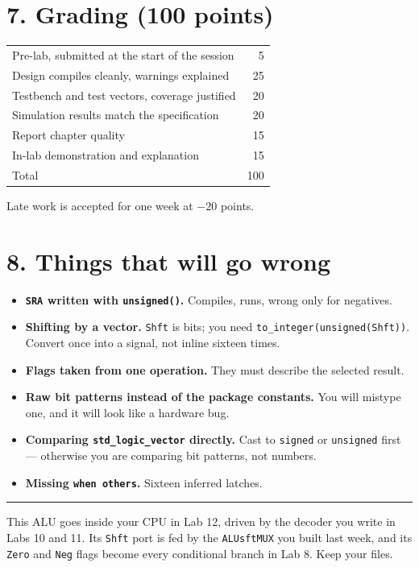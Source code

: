 \documentclass[11pt]{article}
\newcommand{\code}[1]{\texttt{#1}}
\newcommand{\hr}{\vspace{2pt}\hrule\vspace{6pt}}
\begin{document}
\section*{7. Grading (100 points)}

\begin{center}
\begin{tabular}{lr}
\toprule
Pre-lab, submitted at the start of the session & 5 \\
Design compiles cleanly, warnings explained & 25 \\
Testbench and test vectors, coverage justified & 20 \\
Simulation results match the specification & 20 \\
Report chapter quality & 15 \\
In-lab demonstration and explanation & 15 \\
\midrule
Total & 100 \\
\bottomrule
\end{tabular}
\end{center}

Late work is accepted for one week at $-20$ points.

\section*{8. Things that will go wrong}

\begin{itemize}[leftmargin=1.6em,itemsep=1pt]
\item \textbf{\code{SRA} written with \code{unsigned()}.} Compiles, runs, wrong
only for negatives.
\item \textbf{Shifting by a vector.} \code{Shft} is bits; you need
\code{to\_integer(unsigned(Shft))}. Convert once into a signal, not inline
sixteen times.
\item \textbf{Flags taken from one operation.} They must describe the selected
result.
\item \textbf{Raw bit patterns instead of the package constants.} You will
mistype one, and it will look like a hardware bug.
\item \textbf{Comparing \code{std\_logic\_vector} directly.} Cast to
\code{signed} or \code{unsigned} first --- otherwise you are comparing bit
patterns, not numbers.
\item \textbf{Missing \code{when others}.} Sixteen inferred latches.
\end{itemize}

\vspace{10pt}
\hr
{\small This ALU goes inside your CPU in Lab 12, driven by the decoder you write
in Labs 10 and 11. Its \code{Shft} port is fed by the \code{ALUsftMUX} you built
last week, and its \code{Zero} and \code{Neg} flags become every conditional
branch in Lab 8. Keep your files.}
\end{document}
